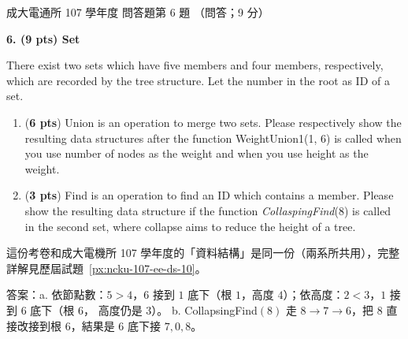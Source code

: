 \begin{pastexam}[label={px:ncku-107-cce-10}]{成大電通所 107 學年度 問答題第 6 題}
（問答；9 分）

\textbf{6. (9 pts) Set}

There exist two sets which have five members and four members, respectively, which are recorded by the tree structure. Let the number in the root as ID of a set.

\begin{center}
\end{center}

\begin{enumerate}[label=\alph*.]
\item (\textbf{6 pts}) Union is an operation to merge two sets. Please respectively show the resulting data structures after the function WeightUnion1(1, 6) is called when you use number of nodes as the weight and when you use height as the weight.
\item (\textbf{3 pts}) Find is an operation to find an ID which contains a member. Please show the resulting data structure if the function \textit{CollaspingFind}(8) is called in the second set, where collapse aims to reduce the height of a tree.
\end{enumerate}
\end{pastexam}

\begin{pastsoln}
這份考卷和成大電機所 107 學年度的「資料結構」是同一份（兩系所共用），完整詳解見歷屆試題~\ref{px:ncku-107-ee-ds-10}。

答案：a. 依節點數：$5 > 4$，$6$ 接到 $1$ 底下（根 $1$，高度 $4$）；依高度：$2 < 3$，$1$ 接到 $6$ 底下（根 $6$，
高度仍是 $3$）。 b. CollapsingFind$(8)$ 走 $8 \to 7 \to 6$，把 $8$ 直接改接到根 $6$，結果是 $6$ 底下接 $7, 0, 8$。
\end{pastsoln}
